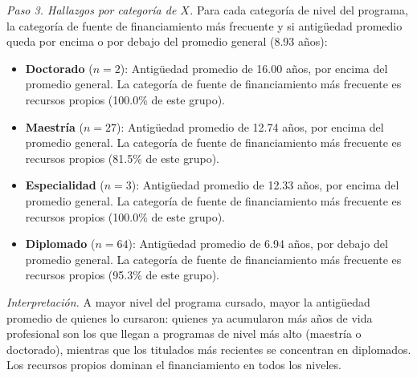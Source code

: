 \textit{Paso 3. Hallazgos por categoría de $X$.} Para cada categoría de nivel del programa, la categoría de fuente de financiamiento más frecuente y si antigüedad promedio queda por encima o por debajo del promedio general (8.93 años):

\begin{itemize}
  \item \textbf{Doctorado} ($n=2$): Antigüedad promedio de 16.00 años, por encima del promedio general. La categoría de fuente de financiamiento más frecuente es recursos propios (100.0\% de este grupo).
  \item \textbf{Maestría} ($n=27$): Antigüedad promedio de 12.74 años, por encima del promedio general. La categoría de fuente de financiamiento más frecuente es recursos propios (81.5\% de este grupo).
  \item \textbf{Especialidad} ($n=3$): Antigüedad promedio de 12.33 años, por encima del promedio general. La categoría de fuente de financiamiento más frecuente es recursos propios (100.0\% de este grupo).
  \item \textbf{Diplomado} ($n=64$): Antigüedad promedio de 6.94 años, por debajo del promedio general. La categoría de fuente de financiamiento más frecuente es recursos propios (95.3\% de este grupo).
\end{itemize}

\textit{Interpretación.} A mayor nivel del programa cursado, mayor la antigüedad promedio de quienes lo cursaron: quienes ya acumularon más años de vida profesional son los que llegan a programas de nivel más alto (maestría o doctorado), mientras que los titulados más recientes se concentran en diplomados. Los recursos propios dominan el financiamiento en todos los niveles.

